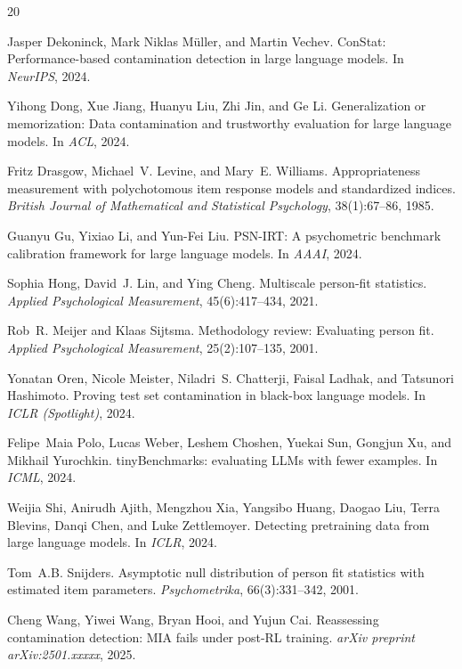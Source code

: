 \documentclass[11pt,a4paper]{article}
\begin{document}

\begin{thebibliography}{20}

Jasper Dekoninck, Mark Niklas M{\"u}ller, and Martin Vechev.
\newblock ConStat: Performance-based contamination detection in large language models.
\newblock In \emph{NeurIPS}, 2024.

Yihong Dong, Xue Jiang, Huanyu Liu, Zhi Jin, and Ge Li.
\newblock Generalization or memorization: Data contamination and trustworthy evaluation for large language models.
\newblock In \emph{ACL}, 2024.

Fritz Drasgow, Michael~V. Levine, and Mary~E. Williams.
\newblock Appropriateness measurement with polychotomous item response models and standardized indices.
\newblock \emph{British Journal of Mathematical and Statistical Psychology}, 38(1):67--86, 1985.

Guanyu Gu, Yixiao Li, and Yun-Fei Liu.
\newblock PSN-IRT: A psychometric benchmark calibration framework for large language models.
\newblock In \emph{AAAI}, 2024.

Sophia Hong, David~J. Lin, and Ying Cheng.
\newblock Multiscale person-fit statistics.
\newblock \emph{Applied Psychological Measurement}, 45(6):417--434, 2021.

Rob~R. Meijer and Klaas Sijtsma.
\newblock Methodology review: Evaluating person fit.
\newblock \emph{Applied Psychological Measurement}, 25(2):107--135, 2001.

Yonatan Oren, Nicole Meister, Niladri~S. Chatterji, Faisal Ladhak, and Tatsunori Hashimoto.
\newblock Proving test set contamination in black-box language models.
\newblock In \emph{ICLR (Spotlight)}, 2024.

Felipe~Maia Polo, Lucas Weber, Leshem Choshen, Yuekai Sun, Gongjun Xu, and Mikhail Yurochkin.
\newblock tinyBenchmarks: evaluating LLMs with fewer examples.
\newblock In \emph{ICML}, 2024.

Weijia Shi, Anirudh Ajith, Mengzhou Xia, Yangsibo Huang, Daogao Liu, Terra Blevins, Danqi Chen, and Luke Zettlemoyer.
\newblock Detecting pretraining data from large language models.
\newblock In \emph{ICLR}, 2024.

Tom~A.B. Snijders.
\newblock Asymptotic null distribution of person fit statistics with estimated item parameters.
\newblock \emph{Psychometrika}, 66(3):331--342, 2001.

Cheng Wang, Yiwei Wang, Bryan Hooi, and Yujun Cai.
\newblock Reassessing contamination detection: MIA fails under post-RL training.
\newblock \emph{arXiv preprint arXiv:2501.xxxxx}, 2025.

\end{thebibliography}
\end{document}
